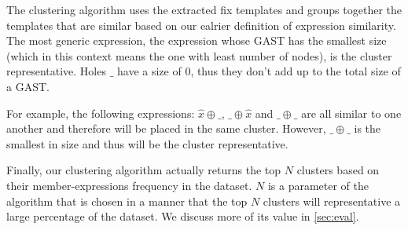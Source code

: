 The clustering algorithm uses the extracted fix templates and groups together
the templates that are similar based on our ealrier definition of expression
similarity. The most generic expression, \ie the expression whose GAST has the
smallest size (which in this context means the one with least number of nodes),
is the cluster representative. Holes $\_$ have a size of $0$, thus they don't
add up to the total size of a GAST.

For example, the following expressions: $\hat{x} \oplus \_$, $\_ \oplus \hat{x}$
and $\_ \oplus \_$ are all similar to one another and therefore will be placed
in the same cluster. However, $\_ \oplus \_$ is the smallest in size and thus
will be the cluster representative.

Finally, our clustering algorithm actually returns the top $N$ clusters based on
their member-expressions frequency in the dataset. $N$ is a parameter of the
algorithm that is chosen in a manner that the top $N$ clusters will
representative a large percentage of the dataset. We discuss more of its value
in \autoref{sec:eval}.
